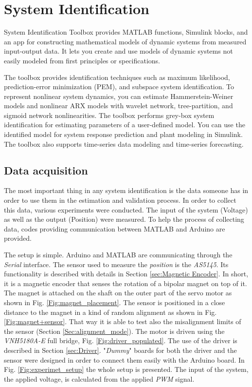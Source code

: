 



\section{System Identification}\label{Sec:system_identification}
	
System Identification Toolbox provides MATLAB functions, Simulink blocks, and an app for constructing mathematical models of dynamic systems from measured input-output data. It lets you create and use models of dynamic systems not easily modeled from first principles or specifications.

The toolbox provides identification techniques such as maximum likelihood, prediction-error minimization (PEM), and subspace system identification. To represent nonlinear system dynamics, you can estimate Hammerstein-Weiner models and nonlinear ARX models with wavelet network, tree-partition, and sigmoid network nonlinearities. The toolbox performs grey-box system identification for estimating parameters of a user-defined model. You can use the identified model for system response prediction and plant modeling in Simulink. The toolbox also supports time-series data modeling and time-series forecasting.


\subsection{Data acquisition}\label{sub:data_acquisition}

The most important thing in any system identification is the data someone has in order to use them in the estimation and validation process. In order to collect this data, various experiments were conducted. The input of the system (Voltage) as well as the output (Position) were measured. To help the process of collecting data, codes providing communication between MATLAB and Arduino are provided. 

The setup is simple. Arduino and MATLAB are communicating through the \textit{Serial} interface. The sensor used to measure the \textit{position} is the \textit{AS5145}. Its functionality is described with details in Section \ref{sec:Magnetic Encoder}. In short, it is a magnetic encoder that senses the rotation of a bipolar magnet on top of it. The magnet is attached on the shaft on the outer part of the servo motor as shown in Fig. \ref{Fig:magnet_placement}. The sensor is positioned in a close distance to the magnet in a kind of random alignment as shown in Fig. \ref{Fig:magnet+sensor}. That way it is able to test also the misalignment limits of the sensor (Section \ref{Sec:alignment_mode}). The motor is driven using the \textit{VNH5180A-E} full bridge, Fig. \ref{Fig:driver_populated}. The use of the driver is described in Section \ref{sec:Driver}. "\textit{Dummy}" boards for both the driver and the sensor were designed in order to connect them easily with the Arduino board. In Fig. \ref{Fig:experimet_setup} the whole setup is presented. The input of the system, the applied voltage, is calculated from the applied \textit{PWM} signal.


